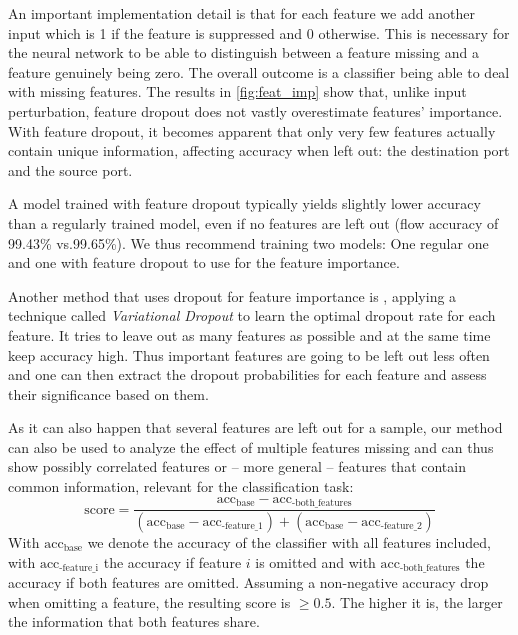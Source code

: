 \documentclass[conference]{IEEEtran}
\begin{document}
An important implementation detail is that for each feature we add another input which is 1 if the feature is suppressed and 0 otherwise. This is necessary for the neural network to be able to distinguish between a feature missing and a feature genuinely being zero. The overall outcome is a classifier being able to deal with missing features.
The results in \autoref{fig:feat_imp} show that, unlike input perturbation, feature dropout  does not vastly overestimate features' importance. With feature dropout, it becomes apparent that only very few features  actually contain unique information, affecting accuracy when left out: the destination port and the source port.

A model trained with feature dropout typically yields slightly lower accuracy than a regularly trained model, even if no features are left out (flow accuracy of 99.43\% vs.99.65\%). We thus recommend training two models: One regular one and one with feature dropout to use for the feature importance.

Another method that uses dropout for feature importance is \cite{chang_dropout_2017}, applying a technique called \textit{Variational Dropout} to learn the optimal dropout rate for each feature. It tries to leave out as many features as possible and at the same time keep accuracy high. Thus important features are going to be left out less often and one can then extract the dropout probabilities for each feature and assess their significance based on them.

As it can also happen that several features are left out for a sample, our method can also be used to analyze the effect of multiple features missing and can thus show possibly correlated features or -- more general -- features that contain common information, relevant for the classification task:
\begin{equation}
\text{score} = \frac{\text{acc}_{\text{base}}-\text{acc}_{\text{-both\_features}}}{\left(\text{acc}_{\text{base}}-\text{acc}_{\text{-feature\_1}}\right) + \left(\text{acc}_{\text{base}}-\text{acc}_{\text{-feature\_2}}\right)}
\end{equation}
With $\text{acc}_{\text{base}}$ we denote the accuracy of the classifier with all features included, with $\text{acc}_{\text{-feature\_i}}$ the accuracy if feature $i$ is omitted and with $\text{acc}_{\text{-both\_features}}$ the accuracy if both features are omitted. Assuming a non-negative accuracy drop when omitting a feature, the resulting score is $\ge 0.5$. The higher it is, the larger the information that both features share.
\end{document}
